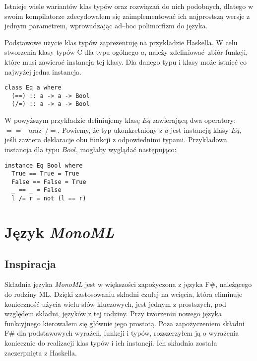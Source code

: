 \documentclass[declaration,shortabstract]{iithesis}
\begin{document}

Istnieje wiele wariantów klas typów oraz rozwiązań do nich podobnych, dlatego w swoim 
kompilatorze zdecydowałem się zaimplementować ich najprostszą wersje z jednym 
parametrem, wprowadzając ad--hoc polimorfizm do języka.

Podstawowe użycie klas typów zaprezentuję na przykładzie Haskella. 
W celu stworzenia klasy typów C dla typu ogólnego $a$, należy 
zdefiniować zbiór funkcji, które musi zawierać instancja tej klasy. Dla danego 
typu i klasy może istnieć co najwyżej jedna instancja. 

\begin{lstlisting}[frame=single, caption=Przykładowa definicja klasy typów.]
class Eq a where
  (==) :: a -> a -> Bool
  (/=) :: a -> a -> Bool
\end{lstlisting}

W powyższym przykładzie definiujemy klasę $Eq$ zawierającą dwa operatory:~$==$ 
~oraz~$/=$. Powiemy, że typ ukonkretniony z $a$ jest instancją klasy $Eq$, 
jeśli zawiera deklaracje obu funkcji z odpowiednimi typami. Przykładowa 
instancja dla typu $Bool$, mogłaby wyglądać następująco:

\begin{lstlisting}[frame=single, caption=Instancja klasy $Eq$ dla typu $Bool$.]
instance Eq Bool where
  True == True = True 
  False == False = True 
  _ == _ = False
  l /= r = not (l == r)
\end{lstlisting}

\chapter{Język \textit{MonoML}}

\section{Inspiracja}
Składnia języka \textit{MonoML} jest w większości zapożyczona z języka F\#, należącego
do rodziny ML. Dzięki zastosowaniu składni czułej na wcięcia, która eliminuje 
konieczność użycia wielu słów kluczowych, jest jednym z prostszych, pod względem 
składni, języków z tej rodziny. Przy tworzeniu nowego języka funkcyjnego kierowałem się głównie 
jego prostotą. Poza zapożyczeniem składni F\# dla podstawowych wyrażeń,
funkcji i typów, rozszerzyłem ją o wyrażenia koniecznie do realizacji klas 
typów i ich instancji. Ich składnia została zaczerpnięta z Haskella.
\end{document}
